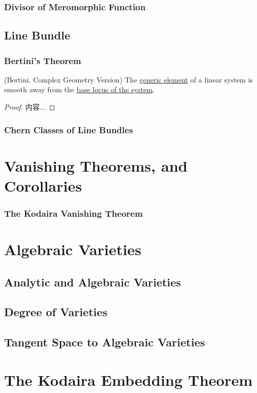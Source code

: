 \documentclass[Total.tex]{subfiles}
\begin{document}
				\subsubsection{Divisor of Meromorphic Function}
			\subsection{Line Bundle}
				\subsubsection{Bertini's Theorem}
					\begin{theorem}
						(Bertini, Complex Geometry Version) The \underline{generic element} of a linear system is smooth away from the \underline{base locus of the system}.
					\end{theorem}
					\begin{proof}
						内容...
					\end{proof}
				\subsubsection{Chern Classes of Line Bundles}
		\section{Vanishing Theorems, and Corollaries}
			\subsubsection{The Kodaira Vanishing Theorem}
			
		\section{Algebraic Varieties}
			\subsection{Analytic and Algebraic Varieties}
			\subsection{Degree of Varieties}
			\subsection{Tangent Space to Algebraic Varieties}
		\section{The Kodaira Embedding Theorem}
\end{document}
